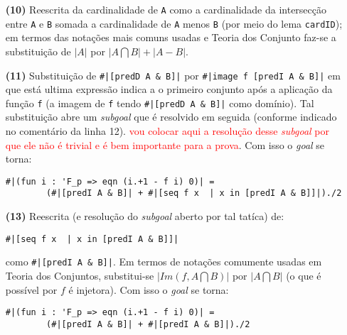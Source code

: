 \begin{enumerate}[label=\textbf{\roman*.}]
\begin{enumerate}[label=\textbf{(\alph*)}]
\begin{enumerate}[label=\textbf{(\alph{enumii}.\arabic*)}]
\begin{enumerate}[listparindent=\parindent]
                                \item[\textbf{(10)}] Reescrita da cardinalidade de \lstinline[language=coq]!A! como a cardinalidade da intersecção entre \lstinline[language=coq]!A! e \lstinline[language=coq]!B! somada a cardinalidade de \lstinline[language=coq]!A! menos \lstinline[language=coq]!B! (por meio do lema \lstinline[language=coq]!cardID!); em termos das notações mais comuns usadas e Teoria dos Conjunto faz-se a substituição de $|A|$ por $|A \bigcap B| + |A - B|$.
                                
                                \item[\textbf{(11)}] Substituição de \lstinline[language=coq]!#|[predD A & B]|! por \lstinline[language=coq]!#|image f [predI A & B]|! em que está ultima expressão indica a o primeiro conjunto após a aplicação da função \lstinline[language=coq]!f! (a imagem de \lstinline[language=coq]!f! tendo \lstinline[language=coq]!#|[predD A & B]|! como domínio). Tal substituição abre um \textit{subgoal} que é resolvido em seguida (conforme indicado no comentário da linha 12). \textcolor{red}{vou colocar aqui a resolução desse \textit{subgoal} por que ele não é trivial e é bem importante para a prova}. Com isso o \textit{goal} se torna:
                                
                                        \begin{lstlisting}[language=coq,frame=single,tabsize=1]
#|(fun i : 'F_p => eqn (i.+1 - f i) 0)| = 
        (#|[predI A & B]| + #|[seq f x  | x in [predI A & B]]|)./2
                                        \end{lstlisting}

                                \item[\textbf{(13)}] Reescrita (e resolução do \textit{subgoal} aberto por tal tatíca) de:

                                        \begin{lstlisting}[language=coq,frame=single,tabsize=1]
#|[seq f x  | x in [predI A & B]]|
                                        \end{lstlisting}
                                como \lstinline[language=coq]!#|[predI A & B]|!. Em termos de notações comumente usadas em Teoria dos Conjuntos, substitui-se $|Im(f, A \bigcap B)|$ por $|A \bigcap B|$ (o que é possível por $f$ é injetora). Com isso o \textit{goal} se torna:
                                
                                        \begin{lstlisting}[language=coq,frame=single,tabsize=1]
#|(fun i : 'F_p => eqn (i.+1 - f i) 0)| = 
        (#|[predI A & B]| + #|[predI A & B]|)./2
                                        \end{lstlisting}
                                

\end{enumerate}
\end{enumerate}
\end{enumerate}
\end{enumerate}
